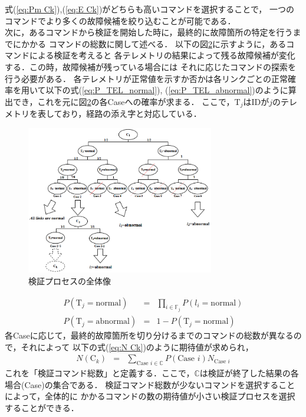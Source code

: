 \documentclass[11pt]{jsarticle}%
\begin{document}
\begin{multicols}{2}
\begin{figure}[H]
       \label{fig:route}
 \end{figure}
式(\ref{eq:Pm Ck}),(\ref{eq:E Ck})がどちらも高いコマンドを選択することで，
一つのコマンドでより多くの故障候補を絞り込むことが可能である．\\
  次に，あるコマンドから検証を開始した時に，最終的に故障箇所の特定を行うまでにかかる
  コマンドの総数に関して述べる．%
以下の図\ref{fig:all_process}に示すように，あるコマンドによる検証を考えると
各テレメトリの結果によって残る故障候補が変化する．この時，故障候補が残っている場合には
それに応じたコマンドの探索を行う必要がある．
各テレメトリが正常値を示すか否かは各リンクごとの正常確率を用いて以下の式(\ref{eq:P_TEL_normal}),
(\ref{eq:P_TEL_abnormal})のように算出でき，これを元に図\ref{fig:all_process}の各Caseへの確率が求まる．
ここで，$\text{T}_j$はIDが$j$のテレメトリを表しており，経路の添え字と対応している．
\begin{figure}[H]
  \centering
    \includegraphics[height=6.5cm]{../figure/all_process.png}
    \caption{検証プロセスの全体像}
    \label{fig:all_process}
\end{figure}
\begin{eqnarray}
  P(\text{T}_j = \text{normal}) &=& \prod_{i\in\mathbb{F}_j} P(l_i = \text{normal}) \label{eq:P_TEL_normal}\\
  P(\text{T}_j = \text{abnormal}) &=& 1 - P(\text{T}_j = \text{normal}) \label{eq:P_TEL_abnormal}
\end{eqnarray}
各Caseに応じて，最終的故障箇所を切り分けるまでのコマンドの総数が異なるので，それによって
以下の式(\ref{eq:N Ck})のように期待値が求められ，
\begin{eqnarray}
  N(\text{C}_k) &=& \sum_{\text{Case }i\in\mathbb{C}} P(\text{Case }i) N_{\text{Case }i} \label{eq:N Ck}
\end{eqnarray}
これを「検証コマンド総数」と定義する．ここで，$\mathbb{C}$は検証が終了した結果の各場合(Case)の集合である．%
検証コマンド総数が少ないコマンドを選択することによって，全体的に
かかるコマンドの数の期待値が小さい検証プロセスを選択することができる．



\end{multicols}
\end{document}

